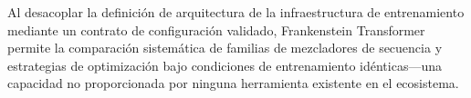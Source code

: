 Al desacoplar la definición de arquitectura de la infraestructura de entrenamiento mediante un contrato de configuración validado, Frankenstein Transformer permite la comparación sistemática de familias de mezcladores de secuencia y estrategias de optimización bajo condiciones de entrenamiento idénticas---una capacidad no proporcionada por ninguna herramienta existente en el ecosistema.
